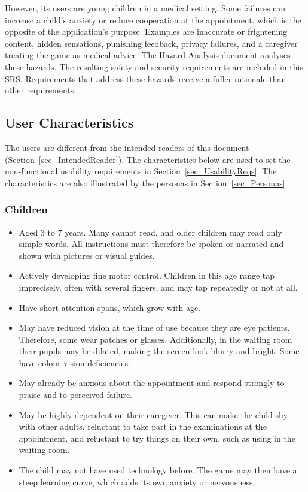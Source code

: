 \documentclass[10pt]{article}
\makeatletter
\newcommand{\termsecnum}{\ifnum\value{subsection}=0 \thesection\else\thesubsection\fi}
\newcommand{\termmark}[1]{%
  \hypertarget{term:#1}{}%
  \protected@write\@auxout{}{\string\newlabel{termsec:#1}{{\termsecnum}{\thepage}{}{}{}}}%
}
\newcommand{\haurl}{https://team-hindsight.github.io/ophthamology-game/HazardAnalysis/HazardAnalysis.pdf}
\newcommand{\hadoc}[1]{\href{\haurl}{#1}}
\makeatother
\begin{document}
However, its users are young children in a medical setting. Some failures can
increase a child's anxiety or reduce cooperation at the appointment, which is
the opposite of the application's purpose. Examples are inaccurate or
frightening content, hidden sensations, punishing feedback, \termmark{privacy}privacy failures,
and a caregiver treating the game as medical advice. The
\hadoc{Hazard Analysis} document analyses these hazards. The resulting safety and security requirements
are included in this SRS. Requirements that address these hazards receive a
fuller rationale than other requirements.

\subsection{User Characteristics} \label{SecUserCharacteristics}

The users are different from the intended readers of this document (Section~\ref{sec_IntendedReader}). 
The characteristics below are used to set the non-functional usability requirements in 
Section~\ref{sec_UsabilityReqs}. The characteristics are also illustrated by the personas in 
Section~\ref{sec_Personas}.

\subsubsection*{\textbf{Children}}

\begin{itemize}
    \item Aged 3 to 7 years. Many cannot read, and older children may read only simple words. All instructions must therefore be spoken or narrated and shown with pictures
    or visual guides.
    \item Actively developing fine motor control. Children in this age range tap imprecisely, often 
    with several fingers, and may tap repeatedly or not at all.
    \item Have short attention spans, which grow with age.
    \item May have reduced vision at the time of use because they are eye patients. Therefore, some 
    wear patches or glasses. Additionally, in the waiting room their pupils may be dilated, 
    making the screen look blurry and bright. Some have colour vision deficiencies.
    \item May already be anxious about the appointment and respond strongly to praise and 
    to perceived failure.
    \item May be highly dependent on their caregiver. This can make the child shy with other
    adults, reluctant to take part in the examinations at the appointment, and reluctant to try
    things on their own, such as using \progname{} in the waiting room.
    \item The child may not have used technology before. The game may then have a steep
    learning curve, which adds its own anxiety or nervousness.
\end{itemize}
\end{document}
